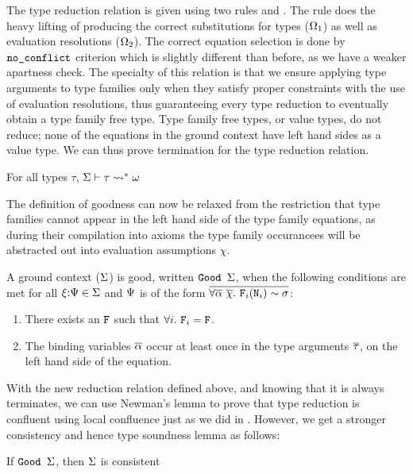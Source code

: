 \documentclass[format=acmsmall,manuscript,review,screen,nonacm,margin=1in,11pt]{acmart}
\begin{document}
The type reduction relation is given using two rules  and .
The rule  does the heavy lifting of producing the correct substitutions
for types ($\Omega_1$) as well as evaluation resolutions ($\Omega_2$). The correct
equation selection is done by $\texttt{no\_conflict}$ criterion which is slightly different than before,
as we have a weaker apartness check.
The specialty of this relation is that we ensure applying type arguments to type families only when
they satisfy proper constraints with the use of evaluation resolutions,
thus guaranteeing every type reduction to eventually obtain a type family free type.
Type family free types, or value types, do not reduce; none of the equations in the
ground context have left hand sides as a value type.
We can thus prove termination for the type reduction relation.
\begin{lemma} For all types $\tau$, $\Sigma \vdash \tau \rightsquigarrow^* \omega$\end{lemma}
The definition of goodness can now be relaxed from the restriction that type families
cannot appear in the left hand side of the type family equations,
as during their compilation into axioms
the type family occurancees will be abstracted out into evaluation assumptions $\chi$.
\begin{property}
  A ground context ($\Sigma$) is good, written $\texttt{Good }\Sigma$, when
  the following conditions are met for all $\xi{:}\Psi\in\Sigma$ and
  $\Psi$ is of the form $\overline{\forall\overline{\alpha}~\overline{\chi}.~\texttt{F}_i(\texttt{N}_i)\mathrel{\sim}\sigma}$:
  \begin{enumerate}
  \item There exists an $\texttt{F}$ such that  $\forall i.~\texttt{F}_i = \texttt{F}$.
  \item The binding variables $\overline{\alpha}$ occur at least once in the type arguments $\overline{\tau}$,
    on the left hand side of the equation.
  \end{enumerate}
\end{property}
With the new reduction relation defined above, and knowing that it is always terminates,
we can use Newman's lemma\cite{newman_theories_1942} to prove that type reduction is confluent using
local confluence just as we did in \CLTF. However, we get a stronger consistency and hence type soundness lemma as follows:
\begin{lemma} If $\texttt{Good }\Sigma$, then $\Sigma$ is consistent \end{lemma}
\end{document}
